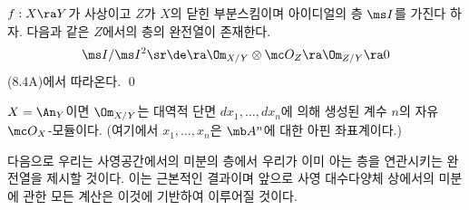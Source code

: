 	
	\begin{proposition}
	$f:X\ra Y$가 사상이고 $Z$가 $X$의 닫힌 부분스킴이며 아이디얼의 층 $\ms I$를 가진다 하자.
	다음과 같은 $Z$에서의 층의 완전열이 존재한다.
	$$\ms I/\ms I^2\sr\de\ra\Om_{X/Y}\otimes\mc O_Z\ra\Om_{Z/Y}\ra 0$$
	\pf (8.4A)에서 따라온다.
	\qed
	\end{proposition}
	
	
	\begin{example}
	$X=\An_Y$이면 $\Om_{X/Y}$는 대역적 단면 $dx_1,\ldots,dx_n$에 의해 생성된 계수 $n$의 자유 $\mc O_X$-모듈이다.
	(여기에서 $x_1,\ldots,x_n$은 $\mb A^n$에 대한 아핀 좌표계이다.)
	\end{example}
	
	다음으로 우리는 사영공간에서의 미분의 층에서 우리가 이미 아는 층을 연관시키는 완전열을 제시할 것이다.
	이는 근본적인 결과이며 앞으로 사영 대수다양체 상에서의 미분에 관한 모든 계산은 이것에 기반하여 이루어질 것이다.
	
